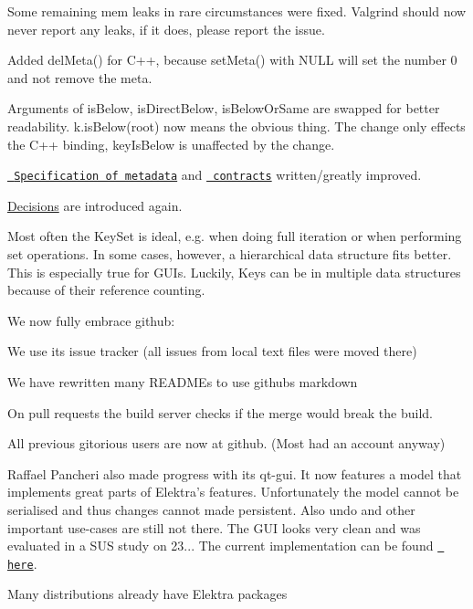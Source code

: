 Some remaining mem leaks in rare circumstances were fixed. Valgrind should now never report any leaks, if it does, please report the issue.

Added del\+Meta() for C++, because set\+Meta() with N\+U\+LL will set the number 0 and not remove the meta.

Arguments of is\+Below, is\+Direct\+Below, is\+Below\+Or\+Same are swapped for better readability. k.\+is\+Below(root) now means the obvious thing. The change only effects the C++ binding, key\+Is\+Below is unaffected by the change.

\href{/home/mpranj/workspace/libelektra/doc/METADATA.ini}{\texttt{ Specification of metadata}} and \href{/home/mpranj/workspace/libelektra/doc/CONTRACT.ini}{\texttt{ contracts}} written/greatly improved.

\mbox{\hyperlink{doc_decisions_README_md}{Decisions}} are introduced again.

Most often the Key\+Set is ideal, e.\+g. when doing full iteration or when performing set operations. In some cases, however, a hierarchical data structure fits better. This is especially true for G\+U\+Is. Luckily, Keys can be in multiple data structures because of their reference counting.

We now fully embrace github\+:


\begin{DoxyItemize}
\item We use its issue tracker (all issues from local text files were moved there)
\item We have rewritten many R\+E\+A\+D\+M\+Es to use githubs markdown
\item On pull requests the build server checks if the merge would break the build.
\item All previous gitorious users are now at github. (Most had an account anyway)
\end{DoxyItemize}

Raffael Pancheri also made progress with its qt-\/gui. It now features a model that implements great parts of Elektra’s features. Unfortunately the model cannot be serialised and thus changes cannot made persistent. Also undo and other important use-\/cases are still not there. The G\+UI looks very clean and was evaluated in a S\+US study on 23... The current implementation can be found \href{https://github.com/0003088/qt-gui}{\texttt{ here}}.

Many distributions already have Elektra packages


